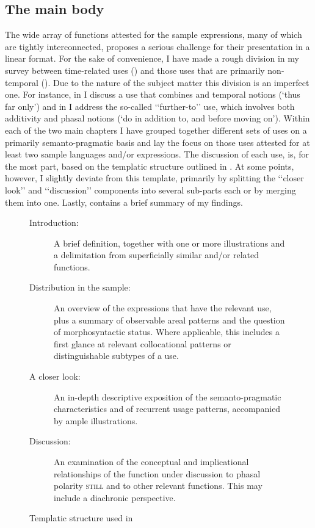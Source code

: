 \subsection{The main body}
The wide array of functions attested for the sample expressions, many of which are tightly interconnected, proposes a serious challenge for their presentation in a linear format. For the sake of convenience, I have made a rough division in my survey between time-related uses () and those uses that are primarily non-temporal (). Due to the nature of the subject matter this division is an imperfect one. For instance, in  I discuss a use that combines  and temporal notions (\lq thus far only\rq{}) and in    I address the so-called \lq\lq further-to\rq\rq{ }\parencite{Klein2018} use, which involves both additivity and phasal notions (\lq do in addition to, and before moving on\rq{}). Within each of the two main chapters I have grouped together different sets of uses on a primarily semanto-pragmatic basis and lay the focus on those uses attested for at least two sample languages and/or expressions. The discussion of each use, is, for the most part, based on the templatic structure outlined in . At some points, however, I slightly deviate from this template, primarily by splitting the \lq\lq{}closer look\rq\rq{ }and \lq\lq{}discussion\rq\rq{ }components into several sub-parts each or by merging them into one. Lastly,  contains a brief summary of my findings.

\begin{figure}
\caption{Templatic structure used in }\label{figureTemplaticStructure}
\begin{PersohnBox}
	\begin{description}
	\item[Introduction:] A brief definition, together with one or more illustrations and a delimitation from superficially similar and/or related functions.
	\item[Distribution in the sample:] An overview of the expressions that have the relevant use, plus a summary of observable areal patterns and the question of morphosyntactic status. Where applicable, this includes a first glance at relevant collocational patterns or distinguishable subtypes of a use.
	\item[A closer look:] An in-depth descriptive exposition of the semanto-pragmatic characteristics and of recurrent usage patterns, accompanied by ample illustrations.
	\item[Discussion:] An examination of the conceptual and implicational relationships of the function under discussion to phasal polarity \textsc{still} and to other relevant functions. This may include a diachronic perspective.
	\end{description}
\end{PersohnBox}
\end{figure}

